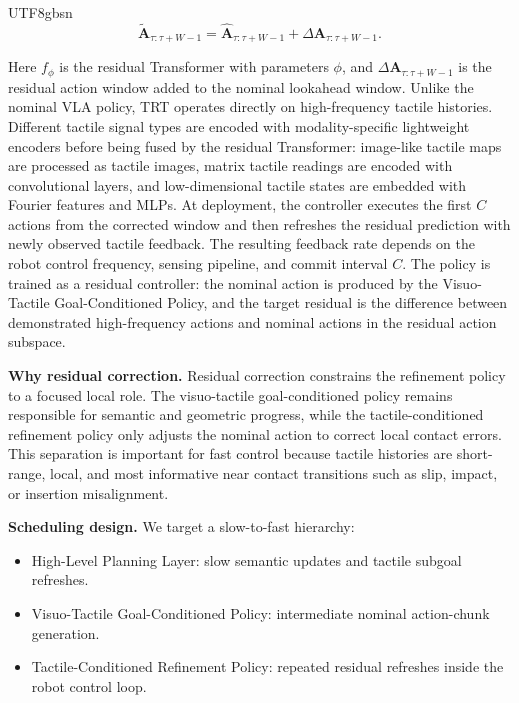 \documentclass[]{mpai_report}
\begin{document}
\begin{CJK*}{UTF8}{gbsn}
\begin{equation}
    \tilde{\mathbf{A}}_{\tau:\tau+W-1}
    =
    \hat{\mathbf{A}}_{\tau:\tau+W-1}
    +
    \Delta \mathbf{A}_{\tau:\tau+W-1}.
\end{equation}

Here $f_{\phi}$ is the residual Transformer with parameters $\phi$, and $\Delta \mathbf{A}_{\tau:\tau+W-1}$ is the residual action window added to the nominal lookahead window.
Unlike the nominal VLA policy, TRT operates directly on high-frequency tactile histories.
Different tactile signal types are encoded with modality-specific lightweight encoders before being fused by the residual Transformer: image-like tactile maps are processed as tactile images, matrix tactile readings are encoded with convolutional layers, and low-dimensional tactile states are embedded with Fourier features and MLPs.
At deployment, the controller executes the first $C$ actions from the corrected window and then refreshes the residual prediction with newly observed tactile feedback.
The resulting feedback rate depends on the robot control frequency, sensing pipeline, and commit interval $C$.
The policy is trained as a residual controller: the nominal action is produced by the Visuo-Tactile Goal-Conditioned Policy, and the target residual is the difference between demonstrated high-frequency actions and nominal actions in the residual action subspace.

\noindent\textbf{Why residual correction.}
Residual correction constrains the refinement policy to a focused local role.
The visuo-tactile goal-conditioned policy remains responsible for semantic and geometric progress, while the tactile-conditioned refinement policy only adjusts the nominal action to correct local contact errors.
This separation is important for fast control because tactile histories are short-range, local, and most informative near contact transitions such as slip, impact, or insertion misalignment.

\noindent\textbf{Scheduling design.}
We target a slow-to-fast hierarchy:

\begin{itemize}
    \item High-Level Planning Layer: slow semantic updates and tactile subgoal refreshes.
    \item Visuo-Tactile Goal-Conditioned Policy: intermediate nominal action-chunk generation.
    \item Tactile-Conditioned Refinement Policy: repeated residual refreshes inside the robot control loop.
\end{itemize}


\end{CJK*}
\end{document}
